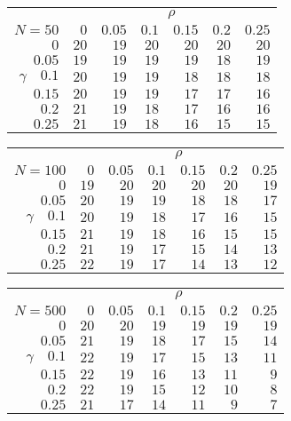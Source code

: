 \begin{tabular}{r|rrrrrr}
\hline\hline
 &\multicolumn{6}{c}{$\rho$} \\ 
 $N = 50$ & $0$ & $0.05$ & $0.1$ & $0.15$ & $0.2$ & $0.25$ \\ 
 \hline$0$ & $20$ & $19$ & $20$ & $20$ & $20$ & $20$\\ 
$0.05$ & $19$ & $19$ & $19$ & $19$ & $18$ & $19$\\ 
$\gamma\quad$$0.1$ & $20$ & $19$ & $19$ & $18$ & $18$ & $18$\\ 
$0.15$ & $20$ & $19$ & $19$ & $17$ & $17$ & $16$\\ 
$0.2$ & $21$ & $19$ & $18$ & $17$ & $16$ & $16$\\ 
$0.25$ & $21$ & $19$ & $18$ & $16$ & $15$ & $15$\\ 
 \hline 
 \end{tabular}
 
 \vspace{2em} 
 
\begin{tabular}{r|rrrrrr}
\hline\hline
 &\multicolumn{6}{c}{$\rho$} \\ 
 $N = 100$ & $0$ & $0.05$ & $0.1$ & $0.15$ & $0.2$ & $0.25$ \\ 
 \hline$0$ & $19$ & $20$ & $20$ & $20$ & $20$ & $19$\\ 
$0.05$ & $20$ & $19$ & $19$ & $18$ & $18$ & $17$\\ 
$\gamma\quad$$0.1$ & $20$ & $19$ & $18$ & $17$ & $16$ & $15$\\ 
$0.15$ & $21$ & $19$ & $18$ & $16$ & $15$ & $15$\\ 
$0.2$ & $21$ & $19$ & $17$ & $15$ & $14$ & $13$\\ 
$0.25$ & $22$ & $19$ & $17$ & $14$ & $13$ & $12$\\ 
 \hline 
 \end{tabular}
 
 \vspace{2em} 
 
\begin{tabular}{r|rrrrrr}
\hline\hline
 &\multicolumn{6}{c}{$\rho$} \\ 
 $N = 500$ & $0$ & $0.05$ & $0.1$ & $0.15$ & $0.2$ & $0.25$ \\ 
 \hline$0$ & $20$ & $20$ & $19$ & $19$ & $19$ & $19$\\ 
$0.05$ & $21$ & $19$ & $18$ & $17$ & $15$ & $14$\\ 
$\gamma\quad$$0.1$ & $22$ & $19$ & $17$ & $15$ & $13$ & $11$\\ 
$0.15$ & $22$ & $19$ & $16$ & $13$ & $11$ & $9$\\ 
$0.2$ & $22$ & $19$ & $15$ & $12$ & $10$ & $8$\\ 
$0.25$ & $21$ & $17$ & $14$ & $11$ & $9$ & $7$\\ 
 \hline 
 \end{tabular}